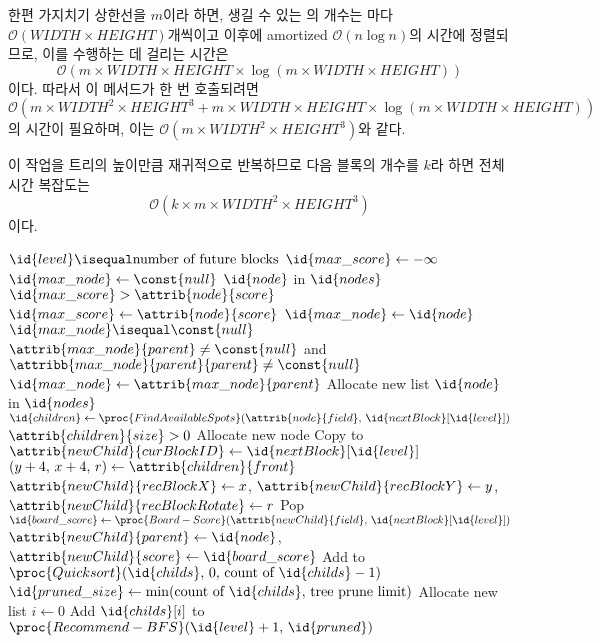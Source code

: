 한편 가지치기 상한선을 $m$이라 하면, 생길 수 있는 의 개수는 마다
$\mathcal{O}\left(WIDTH \times HEIGHT\right)$개씩이고 이후에
amortized $\mathcal{O}\left(n \log n\right)$의 시간에 정렬되므로, 이를 수행하는 데 걸리는 시간은
\[\mathcal{O}\left(m \times WIDTH \times HEIGHT \times \log \left(m \times WIDTH \times HEIGHT\right)\right)\]
이다. 따라서 이 메서드가 한 번 호출되려면
\[\mathcal{O}\left(m \times WIDTH^2 \times HEIGHT^3 + m \times WIDTH \times HEIGHT \times \log \left(m \times WIDTH \times HEIGHT\right)\right)\]
의 시간이 필요하며, 이는 $\mathcal{O}\left(m \times WIDTH^2 \times HEIGHT^3\right)$와 같다.

이 작업을 트리의 높이만큼 재귀적으로 반복하므로 다음 블록의 개수를 $k$라 하면 전체 시간 복잡도는
\[\mathcal{O}\left(k \times m \times WIDTH^2 \times HEIGHT^3\right)\]
이다.

\begin{codebox}
\li \If $\id{level} \isequal \mbox{number of future blocks}$ \Then
\li     $\id{max\_score} \gets -\infty$
\li     $\id{max\_node} \gets \const{null}$
\li     \For $\id{node}$ in $\id{nodes}$ \Do
\li         \If $\id{max\_score} > \attrib{node}{score}$ \Then
\li             $\id{max\_score} \gets \attrib{node}{score}$
\li             $\id{max\_node} \gets \id{node}$
            \End
        \End
\li     \If $\id{max\_node} \isequal \const{null}$ \Then
\li         \Return {}
        \End
\li     \While $\attrib{max\_node}{parent} \neq \const{null}$ and $\attribb{max\_node}{parent}{parent} \neq \const{null}$ \Then
\li         $\id{max\_node} \gets \attrib{max\_node}{parent}$
        \End
\li     \Return {}
    \End
\li Allocate new list 
\li \For $\id{node}$ in $\id{nodes}$ \Do
\li     $\id{children} \gets \proc{FindAvailableSpots}(\attrib{node}{field},\,\id{nextBlock}[\id{level}])$
\li     \While $\attrib{children}{size} > 0$ \Do
\li         Allocate new node 
\li         Copy  to 
\li         $\attrib{newChild}{curBlockID} \gets \id{nextBlock}[\id{level}]$
\li         $(y + 4,\,x + 4,\,r) \gets \attrib{children}{front}$
\li         $\attrib{newChild}{recBlockX} \gets x$, $\attrib{newChild}{recBlockY} \gets y$, $\attrib{newChild}{recBlockRotate} \gets r$
\li         Pop 
\li         $\id{board\_score} \gets \proc{Board-Score}(\attrib{newChild}{field},\,\id{nextBlock}[\id{level}])$
\li         $\attrib{newChild}{parent} \gets \id{node}$, $\attrib{newChild}{score} \gets \id{board\_score}$
\li         Add  to 
        \End
    \End
\li $\proc{Quicksort}(\id{childs},\,0,\,\mbox{count of }\id{childs}-1)$
\li $\id{pruned\_size} \gets \min(\mbox{count of }\id{childs},\,\mbox{tree prune limit})$
\li Allocate new list 
\li \For $i \gets 0$ \To {} \Do
\li     Add $\id{childs}[i]$ to 
    \End
\li \Return $\proc{Recommend-BFS}(\id{level} + 1,\,\id{pruned})$
\end{codebox}

